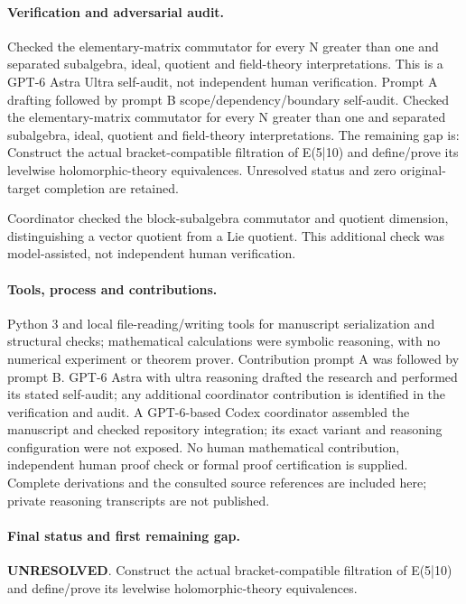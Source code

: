 \documentclass[11pt]{article}
\begin{document}
\paragraph{Verification and adversarial audit.}
Checked the elementary-matrix commutator for every N greater than one and separated subalgebra, ideal, quotient and field-theory interpretations. This is a GPT-6 Astra Ultra self-audit, not independent human verification. Prompt A drafting followed by prompt B scope/dependency/boundary self-audit. Checked the elementary-matrix commutator for every N greater than one and separated subalgebra, ideal, quotient and field-theory interpretations. The remaining gap is: Construct the actual bracket-compatible filtration of E(5|10) and define/prove its levelwise holomorphic-theory equivalences. Unresolved status and zero original-target completion are retained.

Coordinator checked the block-subalgebra commutator and quotient dimension, distinguishing a vector quotient from a Lie quotient. This additional check was model-assisted, not independent human verification.

\paragraph{Tools, process and contributions.}
Python 3 and local file-reading/writing tools for manuscript serialization and structural checks; mathematical calculations were symbolic reasoning, with no numerical experiment or theorem prover. Contribution prompt A was followed by prompt B. GPT-6 Astra with ultra reasoning drafted the research and performed its stated self-audit; any additional coordinator contribution is identified in the verification and audit. A GPT-6-based Codex coordinator assembled the manuscript and checked repository integration; its exact variant and reasoning configuration were not exposed. No human mathematical contribution, independent human proof check or formal proof certification is supplied. Complete derivations and the consulted source references are included here; private reasoning transcripts are not published.

\paragraph{Final status and first remaining gap.}
\textbf{UNRESOLVED}. Construct the actual bracket-compatible filtration of E(5|10) and define/prove its levelwise holomorphic-theory equivalences.
\end{document}
